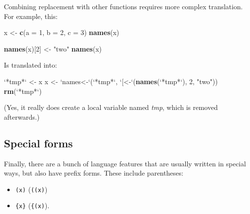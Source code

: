 \documentclass[]{book}
\newenvironment{Shaded}{\begin{snugshade}}{\end{snugshade}}
\newcommand{\KeywordTok}[1]{\textcolor[rgb]{0.13,0.29,0.53}{\textbf{#1}}}
\newcommand{\DataTypeTok}[1]{\textcolor[rgb]{0.13,0.29,0.53}{#1}}
\newcommand{\DecValTok}[1]{\textcolor[rgb]{0.00,0.00,0.81}{#1}}
\newcommand{\StringTok}[1]{\textcolor[rgb]{0.31,0.60,0.02}{#1}}
\newcommand{\NormalTok}[1]{#1}
\providecommand{\tightlist}{%
  \setlength{\itemsep}{0pt}\setlength{\parskip}{0pt}}
\theoremstyle{definition}
\theoremstyle{definition}
\theoremstyle{definition}
\theoremstyle{remark}
\begin{document}
Combining replacement with other functions requires more complex
translation. For example, this:

\begin{Shaded}
\begin{Highlighting}[]
\NormalTok{x <-}\StringTok{ }\KeywordTok{c}\NormalTok{(}\DataTypeTok{a =} \DecValTok{1}\NormalTok{, }\DataTypeTok{b =} \DecValTok{2}\NormalTok{, }\DataTypeTok{c =} \DecValTok{3}\NormalTok{)}
\KeywordTok{names}\NormalTok{(x)}
\end{Highlighting}
\end{Shaded}

\begin{Shaded}
\begin{Highlighting}[]
\KeywordTok{names}\NormalTok{(x)[}\DecValTok{2}\NormalTok{] <-}\StringTok{ "two"}
\KeywordTok{names}\NormalTok{(x)}
\end{Highlighting}
\end{Shaded}

Is translated into:

\begin{Shaded}
\begin{Highlighting}[]
\StringTok{`}\DataTypeTok{*tmp*}\StringTok{`}\NormalTok{ <-}\StringTok{ }\NormalTok{x}
\NormalTok{x <-}\StringTok{ `}\DataTypeTok{names<-}\StringTok{`}\NormalTok{(}\StringTok{`}\DataTypeTok{*tmp*}\StringTok{`}\NormalTok{, }\StringTok{`}\DataTypeTok{[<-}\StringTok{`}\NormalTok{(}\KeywordTok{names}\NormalTok{(}\StringTok{`}\DataTypeTok{*tmp*}\StringTok{`}\NormalTok{), }\DecValTok{2}\NormalTok{, }\StringTok{"two"}\NormalTok{))}
\KeywordTok{rm}\NormalTok{(}\StringTok{`}\DataTypeTok{*tmp*}\StringTok{`}\NormalTok{)}
\end{Highlighting}
\end{Shaded}

(Yes, it really does create a local variable named \emph{tmp}, which is
removed afterwards.)

\subsection{Special forms}\label{special-forms}

Finally, there are a bunch of language features that are usually written
in special ways, but also have prefix forms. These include parentheses:

\begin{itemize}
\tightlist
\item
  \texttt{(x)} (\texttt{\textasciigrave{}(\textasciigrave{}(x)})
\item
  \texttt{\{x\}} (\texttt{\textasciigrave{}\{\textasciigrave{}(x)}).
\end{itemize}
\end{document}
